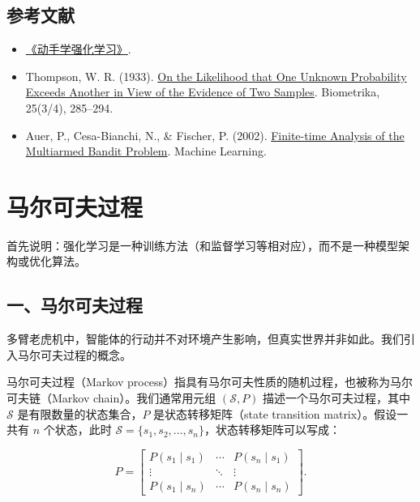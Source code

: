 \hypertarget{ux53c2ux8003ux6587ux732e-42}{%
\subsection{参考文献}\label{ux53c2ux8003ux6587ux732e-42}}

\vspace{0.25em}
\begin{itemize}
\tightlist
\item
  \href{https://hrl.boyuai.com/}{《动手学强化学习》}.
\item
  Thompson, W. R. (1933). \href{https://doi.org/10.1093/biomet/25.3-4.285}{On the Likelihood that One Unknown Probability Exceeds Another in View of the Evidence of Two Samples}. Biometrika, 25(3/4), 285--294.
\item
  Auer, P., Cesa-Bianchi, N., \& Fischer, P. (2002). \href{https://link.springer.com/article/10.1023/A:1013689704352}{Finite-time Analysis of the Multiarmed Bandit Problem}. Machine Learning.
\end{itemize}

\clearpage

\hypertarget{ux9a6cux5c14ux53efux592bux8fc7ux7a0b}{%
\section{马尔可夫过程}\label{ux9a6cux5c14ux53efux592bux8fc7ux7a0b}}

首先说明：强化学习是一种训练方法（和监督学习等相对应），而不是一种模型架构或优化算法。

\hypertarget{ux4e00ux9a6cux5c14ux53efux592bux8fc7ux7a0b}{%
\subsection{一、马尔可夫过程}\label{ux4e00ux9a6cux5c14ux53efux592bux8fc7ux7a0b}}

多臂老虎机中，智能体的行动并不对环境产生影响，但真实世界并非如此。我们引入马尔可夫过程的概念。

马尔可夫过程（Markov process）指具有马尔可夫性质的随机过程，也被称为马尔可夫链（Markov chain）。我们通常用元组 \((\mathcal{S},P)\) 描述一个马尔可夫过程，其中 \(\mathcal{S}\) 是有限数量的状态集合，\(P\) 是状态转移矩阵（state transition matrix）。假设一共有 \(n\) 个状态，此时 \(\mathcal{S}=\{s_1,s_2,\ldots,s_n\}\)，状态转移矩阵可以写成：

\[
P=
\begin{bmatrix}
P(s_1\mid s_1) & \cdots & P(s_n\mid s_1)\\
\vdots & \ddots & \vdots\\
P(s_1\mid s_n) & \cdots & P(s_n\mid s_n)
\end{bmatrix}.
\]

